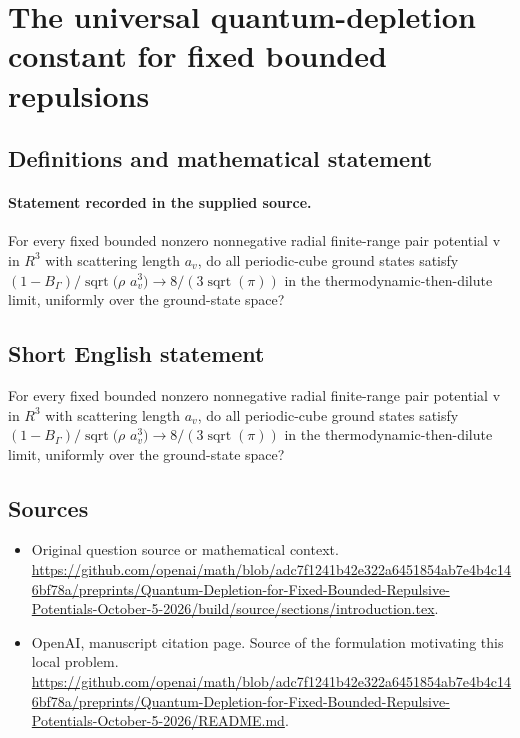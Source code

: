 \documentclass[11pt]{article}
\begin{document}
\section*{The universal quantum-depletion constant for fixed bounded repulsions}\label{30007223}
\subsection{Definitions and mathematical statement}
\paragraph{Statement recorded in the supplied source.}
For every fixed bounded nonzero nonnegative radial finite-range pair potential v in $R^3$ with scattering length $a_v$, do all periodic-cube ground states satisfy $(1-B_\Gamma )/\operatorname{sqrt}(\rho $ $a_v^3)\to 8/(3\operatorname{sqrt}(\pi ))$ in the thermodynamic-then-dilute limit, uniformly over the ground-state space?
\subsection{Short English statement}
For every fixed bounded nonzero nonnegative radial finite-range pair potential v in $R^3$ with scattering length $a_v$, do all periodic-cube ground states satisfy $(1-B_\Gamma )/\operatorname{sqrt}(\rho $ $a_v^3)\to 8/(3\operatorname{sqrt}(\pi ))$ in the thermodynamic-then-dilute limit, uniformly over the ground-state space?
\subsection{Sources}
\begin{itemize}
\item[S1] Original question source or mathematical context.
\url{https://github.com/openai/math/blob/adc7f1241b42e322a6451854ab7e4b4c146bf78a/preprints/Quantum-Depletion-for-Fixed-Bounded-Repulsive-Potentials-October-5-2026/build/source/sections/introduction.tex}.
\item[S2] OpenAI, manuscript citation page. Source of the formulation motivating this local problem.
\url{https://github.com/openai/math/blob/adc7f1241b42e322a6451854ab7e4b4c146bf78a/preprints/Quantum-Depletion-for-Fixed-Bounded-Repulsive-Potentials-October-5-2026/README.md}.
\end{itemize}
\end{document}

